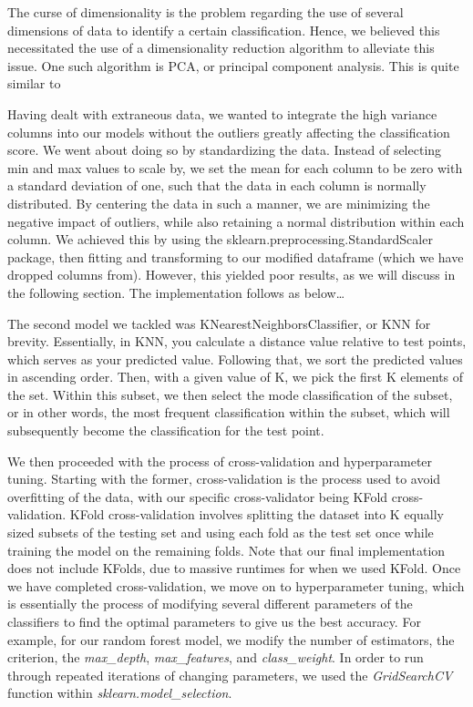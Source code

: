 \documentclass[conference]{IEEEtran}
\begin{document}
The curse of dimensionality is the problem regarding the use of several dimensions of data to identify a certain classification. Hence, we believed this necessitated the use of a dimensionality reduction algorithm to alleviate this issue. One such algorithm is PCA, or principal component analysis. This is quite similar to 

Having dealt with extraneous data, we wanted to integrate the high variance columns into our models without the outliers greatly affecting the classification score. We went about doing so by standardizing the data. Instead of selecting min and max values to scale by, we set the mean for each column to be zero with a standard deviation of one, such that the data in each column is normally distributed. By centering the data in such a manner, we are minimizing the negative impact of outliers, while also retaining a normal distribution within each column. We achieved this by using the sklearn.preprocessing.StandardScaler package, then fitting and transforming to our modified dataframe (which we have dropped columns from). However, this yielded poor results, as we will discuss in the following section. The implementation follows as below…

The second model we tackled was KNearestNeighborsClassifier, or KNN for brevity. Essentially, in KNN, you calculate a distance value relative to test points, which serves as your predicted value. Following that, we sort the predicted values in ascending order. Then, with a given value of K, we pick the first K elements of the set. Within this subset, we then select the mode classification of the subset, or in other words, the most frequent classification within the subset, which will subsequently become the classification for the test point.

We then proceeded with the process of cross-validation and hyperparameter tuning. Starting with the former, cross-validation is the process used to avoid overfitting of the data, with our specific cross-validator being KFold cross-validation.	
KFold cross-validation involves splitting the dataset into K equally sized subsets of the testing set and using each fold as the test set once while training the model on the remaining folds. Note that our final implementation does not include KFolds, due to massive runtimes for when we used KFold. Once we have completed cross-validation, we move on to hyperparameter tuning, which is essentially the process of modifying several different parameters of the classifiers to find the optimal parameters to give us the best accuracy. 
For example, for our random forest model, we modify the number of estimators,
the criterion, the \emph{max\_depth}, \emph{max\_features}, and \emph{class\_weight}. In order to run through repeated iterations of changing parameters, we used the \emph{GridSearchCV} function within \emph{sklearn.model\_selection}.
\end{document}
